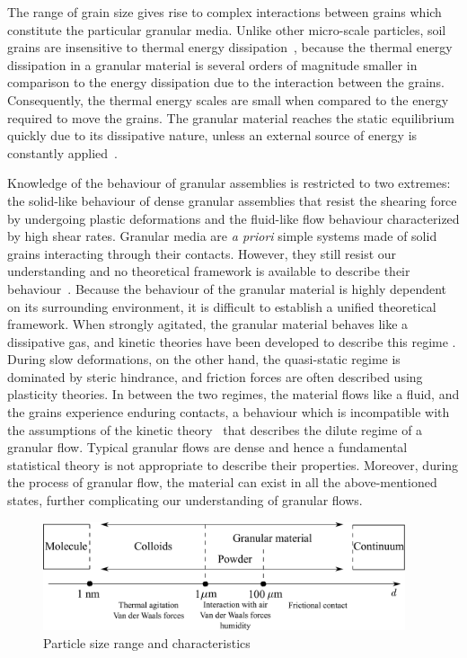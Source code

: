 The range of grain size gives rise to complex interactions between grains 
which constitute the particular granular media. Unlike other micro-scale 
particles, soil grains are insensitive to thermal energy 
dissipation~\citep{Mehta2011}, because the thermal energy 
dissipation in a granular material is several orders of magnitude smaller in 
comparison to the energy dissipation due to the interaction between the grains. 
Consequently, the thermal energy scales are small when compared to the energy 
required to move the grains. The granular material reaches the static 
equilibrium quickly due to its dissipative nature, unless an external source of 
energy is 
constantly applied~\citep{Choi2005}. 

Knowledge of the behaviour of granular assemblies 
is restricted to two extremes: the solid-like behaviour of dense granular 
assemblies that resist the shearing force by undergoing plastic deformations 
and the fluid-like flow behaviour characterized by high shear rates. Granular 
media are \textit{a priori} simple systems made of solid grains interacting 
through their contacts. However, they still resist our understanding and no 
theoretical framework is available to describe their 
behaviour~\citep{Pouliquen2006}. Because the behaviour of the granular material 
is highly dependent on its surrounding environment, it is difficult to 
establish a unified theoretical framework. When strongly agitated, the granular 
material behaves like a dissipative gas, and kinetic theories have been 
developed to describe this regime \citep{Xu2003,Popken1999}. During slow 
deformations, on the other hand, the quasi-static regime is dominated by steric 
hindrance, and friction forces are often described using plasticity theories. 
In between the two regimes, the material flows like a fluid, and the grains 
experience enduring contacts, a behaviour which is incompatible with the 
assumptions of the kinetic theory~\citep{Pouliquen2006} that describes the 
dilute regime of a granular flow. Typical granular flows are dense and hence a 
fundamental statistical theory is not appropriate to describe their properties. 
Moreover, during the process of granular flow, the material can exist in all 
the above-mentioned states, further complicating our understanding of 
granular flows.

\begin{figure}[htbp]
\centering
\includegraphics[width=0.95\textwidth]{Granular}
\caption{Particle size range and characteristics}
\label{fig:granular}
\end{figure}

